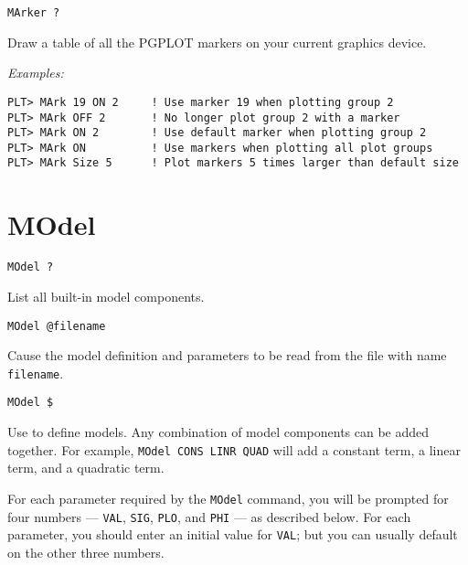 \medskip
\begin{verbatim}
MArker ?
\end{verbatim}
   Draw a table of all the PGPLOT markers on your current graphics
device.

\medskip\noindent
{\em Examples:}
\begin{verbatim}
PLT> MArk 19 ON 2     ! Use marker 19 when plotting group 2
PLT> MArk OFF 2       ! No longer plot group 2 with a marker
PLT> MArk ON 2        ! Use default marker when plotting group 2
PLT> MArk ON          ! Use markers when plotting all plot groups
PLT> MArk Size 5      ! Plot markers 5 times larger than default size
\end{verbatim}

\section*{MOdel}
\begin{verbatim}
MOdel ?
\end{verbatim}
   List all built-in model components.

\medskip
\begin{verbatim}
MOdel @filename
\end{verbatim}
   Cause the model definition and parameters to be read from the file
with name {\tt filename}.

\medskip
\begin{verbatim}
MOdel $
\end{verbatim}
   Use to define models.  Any combination of model components can
be added together.  For example, {\tt MOdel~CONS~LINR~QUAD} will add a
constant term, a linear term, and a quadratic term.

For each parameter required by the {\tt MOdel} command, you will be prompted
for four numbers --- {\tt VAL}, {\tt SIG}, {\tt PLO}, and {\tt  PHI} --- as described below.
For each parameter, you should enter an initial value for {\tt VAL}; but
you can usually default on the other three numbers.

